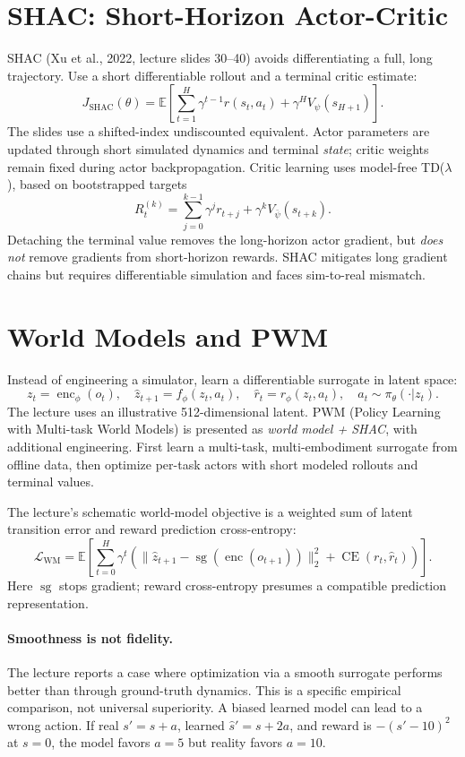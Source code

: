 \section{SHAC: Short-Horizon Actor-Critic}
SHAC (Xu et al., 2022, lecture slides 30--40) avoids differentiating a full, long trajectory. Use a short differentiable rollout and a terminal critic estimate:
\[
J_{\mathrm{SHAC}}(\theta)=\mathbb E[
\sum_{t=1}^{H}\gamma^{t-1}r(s_t,a_t)
+\gamma^H V_\psi(s_{H+1})].
\]
The slides use a shifted-index undiscounted equivalent. Actor parameters are updated through short simulated dynamics and terminal \emph{state}; critic weights remain fixed during actor backpropagation. Critic learning uses model-free TD($\lambda$), based on bootstrapped targets
\[
R_t^{(k)}=\sum_{j=0}^{k-1}\gamma^j r_{t+j}
+\gamma^k V_{\bar\psi}(s_{t+k}).
\]
Detaching the terminal value removes the long-horizon actor gradient, but \emph{does not} remove gradients from short-horizon rewards. SHAC mitigates long gradient chains but requires differentiable simulation and faces sim-to-real mismatch.

\section{World Models and PWM}
Instead of engineering a simulator, learn a differentiable surrogate in latent space:
\[
z_t=\operatorname{enc}_\phi(o_t),\quad
\hat z_{t+1}=f_\phi(z_t,a_t),\quad
\hat r_t=r_\phi(z_t,a_t),\quad
a_t\sim\pi_\theta(\cdot|z_t).
\]
The lecture uses an illustrative 512-dimensional latent. PWM (Policy Learning with Multi-task World Models) is presented as \emph{world model + SHAC}, with additional engineering. First learn a multi-task, multi-embodiment surrogate from offline data, then optimize per-task actors with short modeled rollouts and terminal values.

The lecture's schematic world-model objective is a weighted sum of latent transition error and reward prediction cross-entropy:
\[
\mathcal L_{\mathrm{WM}}=\mathbb E[
\sum_{t=0}^H\gamma^t(
\|\hat z_{t+1}-\operatorname{sg}(\operatorname{enc}(o_{t+1}))\|_2^2
+\operatorname{CE}(r_t,\hat r_t))].
\]
Here $\operatorname{sg}$ stops gradient; reward cross-entropy presumes a compatible prediction representation.

\paragraph{Smoothness is not fidelity.}
The lecture reports a case where optimization via a smooth surrogate performs better than through ground-truth dynamics. This is a specific empirical comparison, not universal superiority. A biased learned model can lead to a wrong action. If real $s'=s+a$, learned $\hat s'=s+2a$, and reward is $-(s'-10)^2$ at $s=0$, the model favors $a=5$ but reality favors $a=10$.

